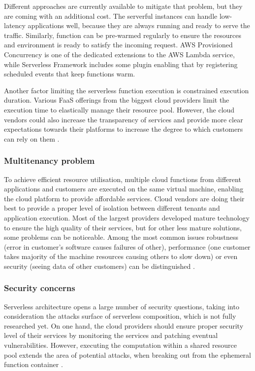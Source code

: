 Different approaches are currently available to mitigate that problem, but they are coming with an additional cost. The serverful instances can handle low-latency applications well, because they are always running and ready to serve the traffic. Similarly, function can be pre-warmed regularly to ensure the resources and environment is ready to satisfy the incoming request. AWS Provisioned Concurrency is one of the dedicated extensions to the AWS Lambda service, while Serverless Framework includes some plugin enabling that by registering scheduled events that keep functions warm.

Another factor limiting the serverless function execution is constrained execution duration. Various FaaS offerings from the biggest cloud providers limit the execution time to elastically manage their resource pool. However, the cloud vendors could also increase the transparency of services and provide more clear expectations towards their platforms to increase the degree to which customers can rely on them \cite{MartinFowlerServerless}.

\subsubsection*{Multitenancy problem}

To achieve efficient resource utilisation, multiple cloud functions from different applications and customers are executed on the same virtual machine, enabling the cloud platform to provide affordable services. Cloud vendors are doing their best to provide a proper level of isolation between different tenants and application execution. Most of the largest providers developed mature technology to ensure the high quality of their services, but for other less mature solutions, some problems can be noticeable. Among the most common issues robustness (error in customer’s software causes failures of other), performance (one customer takes majority of the machine resources causing others to slow down) or even security (seeing data of other customers) can be distinguished \cite{MartinFowlerServerless}.

\subsubsection*{Security concerns}

Serverless architecture opens a large number of security questions, taking into consideration the attacks surface of serverless composition, which is not fully researched yet. On one hand, the cloud providers should ensure proper security level of their services by monitoring the services and patching eventual vulnerabilities. However, executing the computation within a shared resource pool extends the area of potential attacks, when breaking out from the ephemeral function container \cite{LeveragingServerlessCloudComputingArchitectures}.

